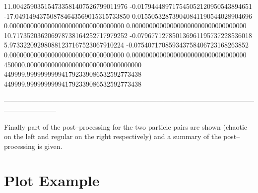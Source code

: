 \begin{ctverbatim}
                     11.004259035154733581407526799011976
                     -0.017944489717545052120950543894651
                    -17.049149437508784643569015315733850
                      0.015505328739040841190544028904696
                      0.000000000000000000000000000000000
                      0.000000000000000000000000000000000
                     10.717352036206978738164252717979252
                     -0.079677127850136961195737228536018
                      5.973322092980881237167523067910224
                     -0.075407170859343758406723168263852
                      0.000000000000000000000000000000000
                      0.000000000000000000000000000000000
                 450000.000000000000000000000000000000000
                 449999.999999999941792339086532592773438
                 449999.999999999941792339086532592773438

-----------------------------------------------------------------------------------------------------------------------------------
\end{ctverbatim}


\clearpage

Finally part of the post--processing for the two particle pairs are shown (chaotic on the left and regular on the right respectively) and a summary of the post--processing is given.

\begin{ctverbatim}

\end{ctverbatim}


\clearpage

\section{Plot Example} \label{plots}

